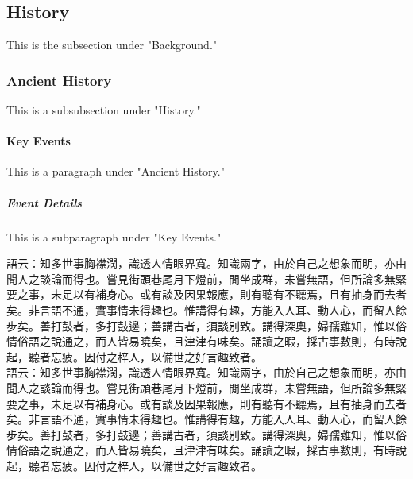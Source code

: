 \documentclass[a5paper, 10pt, openany]{book} %
\begin{document}
\subsection{History}
This is the subsection under "Background."

\subsubsection{Ancient History}
This is a subsubsection under "History."

\paragraph{Key Events}
This is a paragraph under "Ancient History."

\subparagraph{Event Details}
This is a subparagraph under "Key Events."


語云：知多世事胸襟濶，識透人情眼界寬。知識兩字，由於自己之想象而明，亦由聞人之談論而得也。嘗見街頭巷尾月下燈前，閒坐成群，未嘗無語，但所論多無緊要之事，未足以有補身心。或有談及因果報應，則有聽有不聽焉，且有抽身而去者矣。非言語不通，實事情未得趣也。惟講得有趣，方能入人耳、動人心，而留人餘步矣。善打鼓者，多打鼓邊；善講古者，須談別致。講得深奧，婦孺難知，惟以俗情俗語之說通之，而人皆易曉矣，且津津有味矣。誦讀之暇，採古事數則，有時說起，聽者忘疲。因付之梓人，以備世之好言趣致者。\\ 
語云：知多世事胸襟濶，識透人情眼界寬。知識兩字，由於自己之想象而明，亦由聞人之談論而得也。嘗見街頭巷尾月下燈前，閒坐成群，未嘗無語，但所論多無緊要之事，未足以有補身心。或有談及因果報應，則有聽有不聽焉，且有抽身而去者矣。非言語不通，實事情未得趣也。惟講得有趣，方能入人耳、動人心，而留人餘步矣。善打鼓者，多打鼓邊；善講古者，須談別致。講得深奧，婦孺難知，惟以俗情俗語之說通之，而人皆易曉矣，且津津有味矣。誦讀之暇，採古事數則，有時說起，聽者忘疲。因付之梓人，以備世之好言趣致者。\\ 
\end{document}
